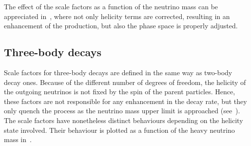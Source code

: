 The effect of the scale factors as a function of the neutrino mass can be appreciated in~, %
where not only helicity terms are corrected, resulting in an enhancement of the production, but also the phase space %
is properly adjusted.

\subsection{Three-body decays}
\label{sec:production_3body}

Scale factors for three-body decays are defined in the same way as two-body decay ones.
Because of the different number of degrees of freedom, the helicity of the outgoing neutrinos is not fixed by %
the spin of the parent particles.
Hence, these factors are not responsible for any enhancement in the decay rate, %
but they only quench the process as the neutrino mass upper limit is approached (see~).
The scale factors have nonetheless distinct behaviours depending on the helicity state involved.
Their behaviour is plotted as a function of the heavy neutrino mass in~.

